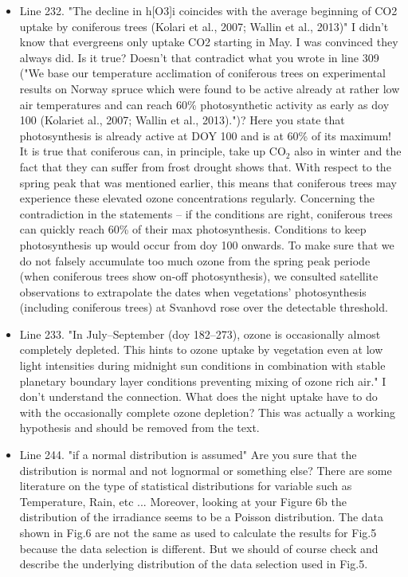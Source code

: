\documentclass{scrartcl}
\begin{document}
\begin{itemize}
\item {\color{blue}Line 232. "The decline in h[O3]i coincides with the average beginning of CO2 uptake by coniferous trees (Kolari et al., 2007; Wallin et al., 2013)" I didn't know that evergreens only uptake CO2 starting in May. I was convinced they always did. Is it true? Doesn't that contradict what you wrote in line 309 ("We base our temperature acclimation of coniferous trees on experimental results on Norway spruce which were found to be active already at rather low air temperatures and can reach 60\% photosynthetic activity as early as doy 100 (Kolariet al., 2007; Wallin et al., 2013).")? Here you state that photosynthesis is already active at DOY 100 and is at 60\% of its maximum!}
It is true that coniferous can, in principle, take up $\mathrm{CO_2}$ also in winter and the fact that they can suffer from frost drought shows that. With respect to the spring peak that was mentioned earlier, this means that coniferous trees may experience these elevated ozone concentrations regularly. Concerning the contradiction in the statements -- if the conditions are right, coniferous trees can quickly reach 60\% of their max photosynthesis. Conditions to keep photosynthesis up would occur from doy 100 onwards. To make sure that we do not falsely accumulate too much ozone from the spring peak periode (when coniferous trees show on-off photosynthesis), we consulted satellite observations to extrapolate the dates when vegetations' photosynthesis (including coniferous trees) at Svanhovd rose over the detectable threshold.

\item {\color{blue}Line 233. "In July--September (doy 182--273), ozone is occasionally almost completely depleted. This hints to ozone uptake by vegetation even at low light intensities during midnight sun conditions in combination with stable planetary boundary layer conditions preventing mixing of ozone rich air."
I don't understand the connection. What does the night uptake have to do with the
occasionally complete ozone depletion?} This was actually a working hypothesis and should be removed from the text.

\item {\color{blue}Line 244. "if a normal distribution is assumed" 
Are you sure that the distribution is normal and not lognormal or something else? There are some literature on the type of statistical distributions for variable such as Temperature, Rain, etc ...
Moreover, looking at your Figure 6b the distribution of the irradiance seems to be a
Poisson distribution.}
The data shown in Fig.6 are not the same as used to calculate the results for Fig.5 because the data selection is different. But we should of course check and describe the underlying distribution of the data selection used in Fig.5.


\end{itemize}
\end{document}
